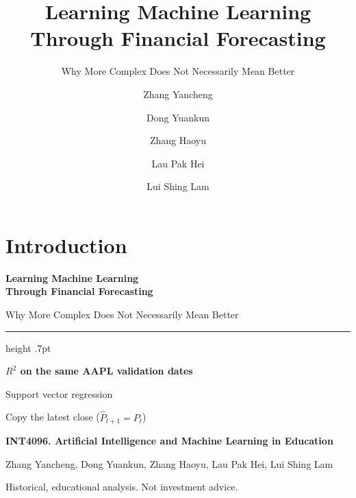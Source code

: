 \documentclass[aspectratio=169,11pt]{beamer}
\title{Learning Machine Learning Through Financial Forecasting}
\subtitle{Why More Complex Does Not Necessarily Mean Better}
\author[INT4096]{%
  Zhang Yancheng \and Dong Yuankun \and Zhang Haoyu \and Lau Pak Hei \and Lui Shing Lam}
\institute{INT4096 --- Artificial Intelligence and Machine Learning in Education\\
  The Education University of Hong Kong, Semester 1, 2026--27}
\date{}
\newcommand{\currentspeaker}{}
\newcommand{\speaker}[1]{\gdef\currentspeaker{#1}}
\newcommand{\act}[1]{\section{#1}}
\begin{document}
\act{Introduction}

\begin{frame}
  \speaker{Dong Yuankun}
  \color{frametitle.bg}
  \setlength{\parskip}{0pt}
  {\bfseries\fontsize{25}{29}\selectfont
    Learning Machine Learning\\
    Through Financial Forecasting\par}
  \vspace{3mm}
  {\large Why More Complex Does Not Necessarily Mean Better\par}
  \vspace{7mm}
  \hrule height .7pt
  \vspace{3mm}
  {\small\bfseries $R^2$ on the same AAPL validation dates\par}
  \vspace{2mm}
  \noindent\begin{minipage}[t]{.48\linewidth}
    {\bfseries\fontsize{34}{37}\selectfont \HookAAPLRsq\par}
    {\small Support vector regression\par}
  \end{minipage}\hfill
  \begin{minipage}[t]{.48\linewidth}
    {\bfseries\fontsize{34}{37}\selectfont \HookAAPLPersistenceRsq\par}
    {\small Copy the latest close ($\widehat{P}_{t+1} = P_t$)\par}
  \end{minipage}\par
  \vspace{6mm}
  {\footnotesize\bfseries INT4096. Artificial Intelligence and Machine Learning in Education\par}
  \vspace{1mm}
  {\footnotesize Zhang Yancheng, Dong Yuankun, Zhang Haoyu, Lau Pak Hei, Lui Shing Lam\par}
  \vspace{1mm}
  {\tiny *Historical, educational analysis. Not investment advice.\par}
\end{frame}
\end{document}
